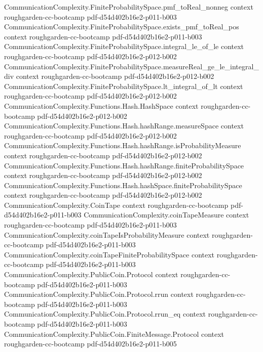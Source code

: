 \begin{theorem}
\proofstep
  {CommunicationComplexity.FiniteProbabilitySpace.pmf_toReal_nonneg}
  {context}
  {roughgarden-cc-bootcamp}
  {pdf-d54d402b16e2-p011-b003}
\proofstep
  {CommunicationComplexity.FiniteProbabilitySpace.exists_pmf_toReal_pos}
  {context}
  {roughgarden-cc-bootcamp}
  {pdf-d54d402b16e2-p011-b003}
\proofstep
  {CommunicationComplexity.FiniteProbabilitySpace.integral_le_of_le}
  {context}
  {roughgarden-cc-bootcamp}
  {pdf-d54d402b16e2-p012-b002}
\proofstep
  {CommunicationComplexity.FiniteProbabilitySpace.measureReal_ge_le_integral_div}
  {context}
  {roughgarden-cc-bootcamp}
  {pdf-d54d402b16e2-p012-b002}
\proofstep
  {CommunicationComplexity.FiniteProbabilitySpace.lt_integral_of_lt}
  {context}
  {roughgarden-cc-bootcamp}
  {pdf-d54d402b16e2-p012-b002}
\proofstep
  {CommunicationComplexity.Functions.Hash.HashSpace}
  {context}
  {roughgarden-cc-bootcamp}
  {pdf-d54d402b16e2-p012-b002}
\proofstep
  {CommunicationComplexity.Functions.Hash.hashRange.measureSpace}
  {context}
  {roughgarden-cc-bootcamp}
  {pdf-d54d402b16e2-p012-b002}
\proofstep
  {CommunicationComplexity.Functions.Hash.hashRange.isProbabilityMeasure}
  {context}
  {roughgarden-cc-bootcamp}
  {pdf-d54d402b16e2-p012-b002}
\proofstep
  {CommunicationComplexity.Functions.Hash.hashRange.finiteProbabilitySpace}
  {context}
  {roughgarden-cc-bootcamp}
  {pdf-d54d402b16e2-p012-b002}
\proofstep
  {CommunicationComplexity.Functions.Hash.hashSpace.finiteProbabilitySpace}
  {context}
  {roughgarden-cc-bootcamp}
  {pdf-d54d402b16e2-p012-b002}
\proofstep
  {CommunicationComplexity.CoinTape}
  {context}
  {roughgarden-cc-bootcamp}
  {pdf-d54d402b16e2-p011-b003}
\proofstep
  {CommunicationComplexity.coinTapeMeasure}
  {context}
  {roughgarden-cc-bootcamp}
  {pdf-d54d402b16e2-p011-b003}
\proofstep
  {CommunicationComplexity.coinTapeIsProbabilityMeasure}
  {context}
  {roughgarden-cc-bootcamp}
  {pdf-d54d402b16e2-p011-b003}
\proofstep
  {CommunicationComplexity.coinTapeFiniteProbabilitySpace}
  {context}
  {roughgarden-cc-bootcamp}
  {pdf-d54d402b16e2-p011-b003}
\proofstep
  {CommunicationComplexity.PublicCoin.Protocol}
  {context}
  {roughgarden-cc-bootcamp}
  {pdf-d54d402b16e2-p011-b003}
\proofstep
  {CommunicationComplexity.PublicCoin.Protocol.rrun}
  {context}
  {roughgarden-cc-bootcamp}
  {pdf-d54d402b16e2-p011-b003}
\proofstep
  {CommunicationComplexity.PublicCoin.Protocol.rrun_eq}
  {context}
  {roughgarden-cc-bootcamp}
  {pdf-d54d402b16e2-p011-b003}
\proofstep
  {CommunicationComplexity.PublicCoin.FiniteMessage.Protocol}
  {context}
  {roughgarden-cc-bootcamp}
  {pdf-d54d402b16e2-p011-b005}
\proofstep

\end{theorem}
